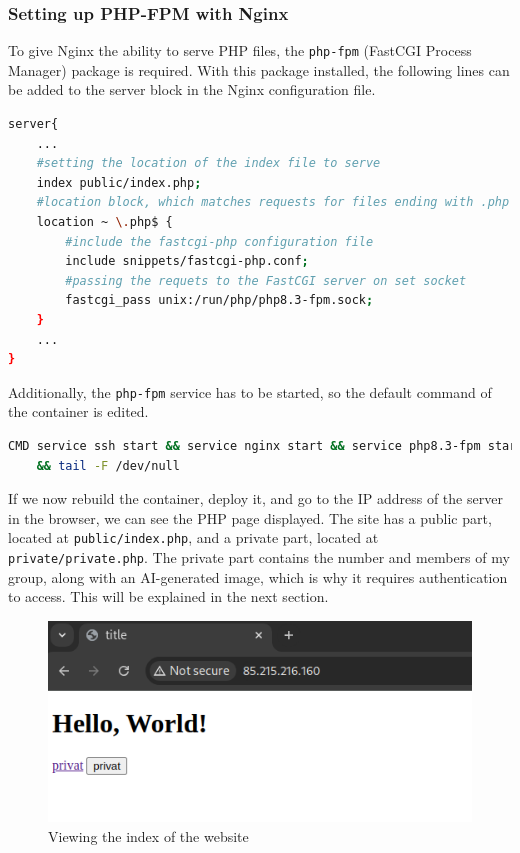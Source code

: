 \documentclass[a4paper]{article}
\newcommand{\abc}{\hfill \break}
\begin{document}
\subsubsection{Setting up PHP-FPM with Nginx}
To give Nginx the ability to serve PHP files, the \texttt{php-fpm} (FastCGI Process Manager) package is required.
With this package installed, the following lines can be added to the server block in the Nginx configuration file.
\begin{lstlisting}[language=bash]
server{
	...
	#setting the location of the index file to serve
	index public/index.php;
	#location block, which matches requests for files ending with .php
	location ~ \.php$ {
		#include the fastcgi-php configuration file
		include snippets/fastcgi-php.conf;
		#passing the requets to the FastCGI server on set socket
		fastcgi_pass unix:/run/php/php8.3-fpm.sock;
	}
	...
}
\end{lstlisting}
Additionally, the \texttt{php-fpm} service has to be started, so the default command of the container is edited.
\begin{lstlisting}[language=bash]
CMD service ssh start && service nginx start && service php8.3-fpm start\
    && tail -F /dev/null
\end{lstlisting}
If we now rebuild the container, deploy it, and go to the IP address of the server in the browser, we can see the PHP page displayed.
The site has a public part, located at \texttt{public/index.php}, and a private part, located at \texttt{private/private.php}. The private part contains the number and members of my group, along with an AI-generated image, which is why it requires authentication to access. This will be explained in the next section.\abc
\begin{figure}[!htbp]
	\includegraphics[scale=0.45]{images/indexphp.png}
	\centering
	\caption{Viewing the index of the website}
\end{figure}
\end{document}
